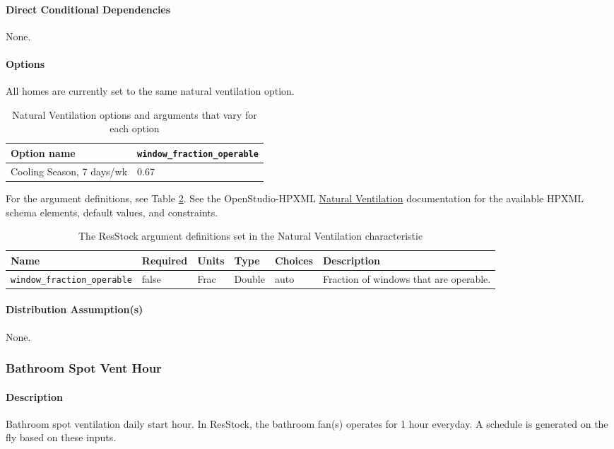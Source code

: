 \paragraph{Direct Conditional Dependencies}
None.

\paragraph{Options}
All homes are currently set to the same natural ventilation option. 
\begin{longtable}[]{|p{5cm}|p{6cm}|}\caption{Natural Ventilation options and arguments that vary for each option} \label{table:hc_opt_hvac_sec_ht} \\
\toprule\noalign{}
Option name & \texttt{window\_fraction\_operable} \\
\midrule\noalign{}
\endhead
\bottomrule\noalign{}
\endlastfoot
Cooling Season, 7 days/wk & 0.67 \\
\end{longtable}

For the argument definitions, see Table \ref{table:hc_arg_def_nat_vent}. See the OpenStudio-HPXML \href{https://openstudio-hpxml.readthedocs.io/en/v1.8.1/workflow_inputs.html#natural-ventilation}{Natural Ventilation} documentation for the available HPXML schema elements, default values, and constraints.

\begin{longtable}[]{|p{3.5cm}|p{1.5cm}|p{1.3cm}|p{1.1cm}|p{}|p{3.3cm}|} \caption{The ResStock argument definitions set in the Natural Ventilation characteristic} \label{table:hc_arg_def_nat_vent}\\
\toprule\noalign{}
Name & Required & Units & Type & Choices & Description \\
\midrule\noalign{}
\endhead
\bottomrule\noalign{}
\endlastfoot
\texttt{window\_fraction\_operable} & false & Frac & Double & auto &
Fraction of windows that are operable. \\
\end{longtable}
\paragraph{Distribution Assumption(s)}
None.

\subsubsection{Bathroom Spot Vent Hour}

\paragraph{Description}
Bathroom spot ventilation daily start hour. In ResStock, the bathroom fan(s) operates for 1 hour everyday. A schedule is generated on the fly based on these inputs.

